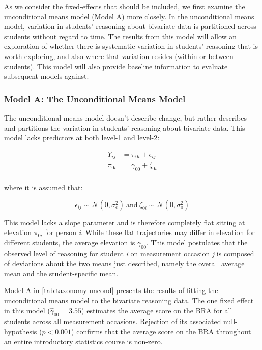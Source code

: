 \documentclass[11pt]{umnthesis}
\begin{document}
As we consider the fixed-effects that should be included, we first examine the unconditional means model (Model A) more closely. In the unconditional means model, variation in students' reasoning about bivariate data is partitioned across students without regard to time. The results from this model will allow an exploration of whether there is systematic variation in students' reasoning that is worth exploring, and also where that variation resides (within or between students). This model will also provide baseline information to evaluate subsequent models against.

\hypertarget{model-a-the-unconditional-means-model}{%
\subsubsection*{Model A: The Unconditional Means Model}\label{model-a-the-unconditional-means-model}}

The unconditional means model doesn't describe change, but rather describes and partitions the variation in students' reasoning about bivariate data. This model lacks predictors at both level-1 and level-2:

\begin{equation}\label{eq:model-a}
\begin{split}
Y_{ij} &= \pi_{0i}  + \epsilon_{ij}\\[2ex]
\pi_{0i} &= \gamma_{00} + \zeta_{0i}\\[1ex]
\end{split}
\end{equation}

where it is assumed that:

\[
\epsilon_{ij} \sim \mathcal{N}(0,\sigma^2_{\epsilon})~\mathrm{and}~\zeta_{0i} \sim \mathcal{N}(0,\sigma^2_{0})
\]

This model lacks a slope parameter and is therefore completely flat sitting at elevation \(\pi_{0i}\) for person \emph{i}. While these flat trajectories may differ in elevation for different students, the average elevation is \(\gamma_{00}\). This model postulates that the observed level of reasoning for student \emph{i} on measurement occasion \emph{j} is composed of deviations about the two means just described, namely the overall average mean and the student-specific mean.

Model A in \ref{tab:taxonomy-uncond} presents the results of fitting the unconditional means model to the bivariate reasoning data. The one fixed effect in this model (\(\hat\gamma_{00}=3.55\)) estimates the average score on the BRA for all students across all measurement occasions. Rejection of its associated null-hypothesis (\(p<0.001\)) confirms that the average score on the BRA throughout an entire introductory statistics course is non-zero.
\end{document}
